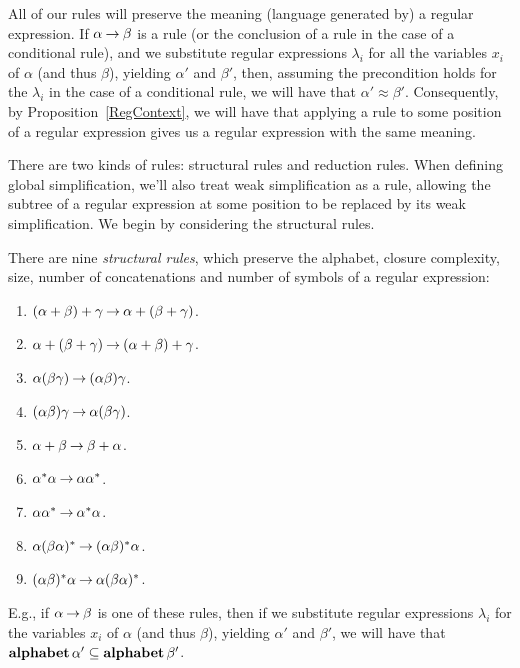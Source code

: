 All of our rules will preserve the meaning (language generated by) a
regular expression. If $\alpha\mathbin{\to}\beta$ is a rule (or the conclusion
of a rule in the case of a conditional rule), and we substitute
regular expressions $\lambda_i$ for all the variables $x_i$ of
$\alpha$ (and thus $\beta$), yielding $\alpha'$ and $\beta'$, then,
assuming the precondition holds for the $\lambda_i$ in the case of a
conditional rule, we will have that
$\alpha'\approx\beta'$. Consequently, by Proposition~\ref{RegContext},
we will have that applying a rule to some position of a regular
expression gives us a regular expression with the same meaning.

There are two kinds of rules: structural rules and reduction rules.
When defining global simplification, we'll also treat weak
simplification as a rule, allowing the subtree of a regular expression
at some position to be replaced by its weak simplification.  We begin
by considering the structural rules.

There are nine \emph{structural rules},
%
%
%
which preserve the alphabet, closure complexity, size, number of
concatenations and number of symbols of a regular expression:
\begin{enumerate}[\quad(1)]
\item $(\alpha + \beta) + \gamma \mathbin{\to} \alpha + (\beta + \gamma)$.

\item $\alpha + (\beta + \gamma) \mathbin{\to} (\alpha + \beta) + \gamma$.

\item $\alpha(\beta\gamma) \mathbin{\to} (\alpha\beta)\gamma$.

\item $(\alpha\beta)\gamma \mathbin{\to} \alpha(\beta\gamma)$.

\item $\alpha + \beta \mathbin{\to} \beta + \alpha$.

\item $\alpha^*\alpha \mathbin{\to} \alpha\alpha^*$.

\item $\alpha\alpha^* \mathbin{\to} \alpha^*\alpha$.

\item $\alpha(\beta\alpha)^* \mathbin{\to} (\alpha\beta)^*\alpha$.

\item $(\alpha\beta)^*\alpha \mathbin{\to} \alpha(\beta\alpha)^*$.
\end{enumerate}
E.g., if $\alpha\mathbin{\to}\beta$ is one of these rules, then if we
substitute regular expressions $\lambda_i$ for the variables $x_i$ of
$\alpha$ (and thus $\beta$), yielding $\alpha'$ and $\beta'$, we will
have that $\mathbf{alphabet}\,\alpha'\subseteq\mathbf{alphabet}\,\beta'$.

